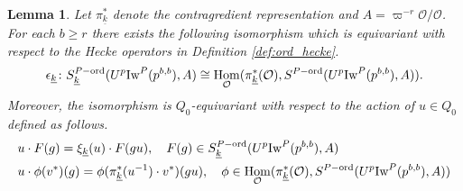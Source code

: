 \documentclass[leqno]{amsart}
\newtheorem{lem}[thm]{Lemma}
\theoremstyle{definition}
\theoremstyle{remark}
\newcommand{\oo}{\mathcal{O}}
\DeclareMathOperator{\Hom}{Hom}
\newcommand{\wt}[1]{\underline{ #1 }}
\newcommand{\Iw}{\textnormal{Iw}} %
\newcommand{\ord}{\textnormal{ord}} %
\begin{document}
\begin{lem}
	Let $\pi_{\wt{k}}^*$ denote the contragredient
	representation and $A=\varpi^{-r}\oo/\oo$.
	For each $b\geq r$ there exists 
    the following isomorphism 
    which is equivariant with respect to the Hecke operators
    in Definition \ref{def:ord_hecke}.
	\[
		\epsilon_{\wt{k}} \colon 
		S_{\wt{k}}^{P-\ord}(U^p\Iw^P(p^{b,b}),A)\cong 
		\Hom_{\oo}(\pi_{\wt{k}}^*(\oo),
		S^{P-\ord}(U^p\Iw^P(p^{b,b}),A)).
	\]
	Moreover, the isomorphism is $Q_0$-equivariant 
    with respect to
	the action of $u\in Q_0$ defined as follows.
	\begin{align*}
	&u\cdot F(g)=\xi_{\wt{k}}(u)\cdot F(gu),\quad
	F(g)\in S_{\wt{k}}^{P-\ord}(U^p\Iw^P(p^{b,b}),A)\\
	&u\cdot \phi(v^*)(g)=
	\phi(\pi^*_{\wt{k}}(u^{-1})\cdot v^*)(gu),\quad
	\phi\in \Hom_{\oo}(\pi_{\wt{k}}^*(\oo),
	S^{P-\ord}(U^p\Iw^P(p^{b,b}),A))
	\end{align*}
\end{lem}
\end{document}
